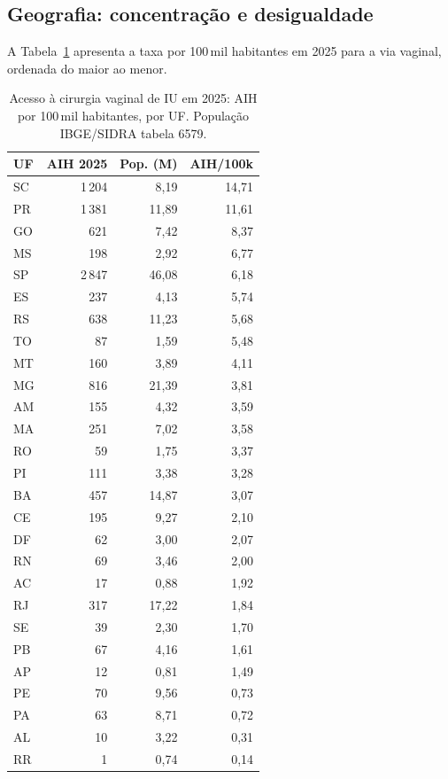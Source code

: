 \documentclass[12pt,a4paper,oneside]{article}
\begin{document}
\subsection{Geografia: concentração e desigualdade}\label{sub:geografia}

A Tabela~\ref{tab:uf-100k} apresenta a taxa por 100\,mil habitantes
em 2025 para a via vaginal, ordenada do maior ao menor.

\begin{table}[H]
\centering
\caption{Acesso à cirurgia vaginal de IU em 2025: AIH por
100\,mil habitantes, por UF. População IBGE/SIDRA tabela 6579.}
\label{tab:uf-100k}
\small
\begin{tabular}{lrrr}
\toprule
\textbf{UF} & \textbf{AIH 2025} & \textbf{Pop. (M)} & \textbf{AIH/100k} \\
\midrule
SC          & 1\,204 &  8{,}19 & 14{,}71 \\
PR          & 1\,381 & 11{,}89 & 11{,}61 \\
GO          &   621  &  7{,}42 &  8{,}37 \\
MS          &   198  &  2{,}92 &  6{,}77 \\
SP          & 2\,847 & 46{,}08 &  6{,}18 \\
ES          &   237  &  4{,}13 &  5{,}74 \\
RS          &   638  & 11{,}23 &  5{,}68 \\
TO          &    87  &  1{,}59 &  5{,}48 \\
MT          &   160  &  3{,}89 &  4{,}11 \\
MG          &   816  & 21{,}39 &  3{,}81 \\
AM          &   155  &  4{,}32 &  3{,}59 \\
MA          &   251  &  7{,}02 &  3{,}58 \\
RO          &    59  &  1{,}75 &  3{,}37 \\
PI          &   111  &  3{,}38 &  3{,}28 \\
BA          &   457  & 14{,}87 &  3{,}07 \\
CE          &   195  &  9{,}27 &  2{,}10 \\
DF          &    62  &  3{,}00 &  2{,}07 \\
RN          &    69  &  3{,}46 &  2{,}00 \\
AC          &    17  &  0{,}88 &  1{,}92 \\
RJ          &   317  & 17{,}22 &  1{,}84 \\
SE          &    39  &  2{,}30 &  1{,}70 \\
PB          &    67  &  4{,}16 &  1{,}61 \\
AP          &    12  &  0{,}81 &  1{,}49 \\
PE          &    70  &  9{,}56 &  0{,}73 \\
PA          &    63  &  8{,}71 &  0{,}72 \\
AL          &    10  &  3{,}22 &  0{,}31 \\
RR          &     1  &  0{,}74 &  0{,}14 \\
\bottomrule
\end{tabular}
\end{table}
\end{document}
